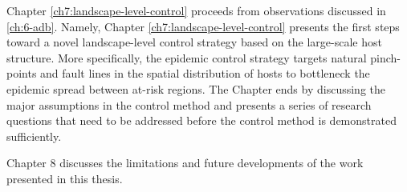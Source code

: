 Chapter \ref{ch7:landscape-level-control} proceeds from observations discussed in \ref{ch:6-adb}. 
Namely, Chapter \ref{ch7:landscape-level-control} presents the first steps toward a novel landscape-level
control strategy based on the large-scale host structure. More specifically, the epidemic control strategy targets
natural pinch-points and fault lines in the spatial distribution of hosts to bottleneck the epidemic
spread between at-risk regions. The Chapter ends by discussing the major assumptions in the control method and presents
a series of research questions that need to be addressed before the control method is demonstrated sufficiently.

Chapter 8 discusses the limitations and future developments of the work presented in this thesis.